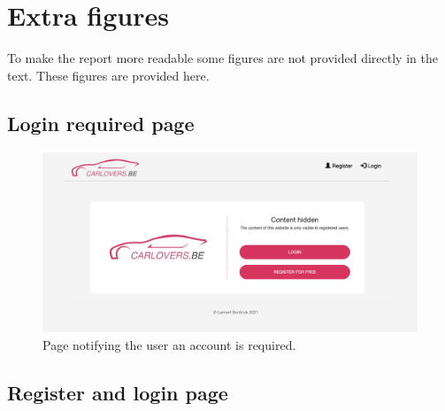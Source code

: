 \chapter*{Extra figures}
\label{ch:extra_figures}

To make the report more readable some figures are not provided directly in the text.
These figures are provided here.

\section*{Login required page}

\begin{figure}[H]
    \centering
    \includegraphics[width=\linewidth]{images/loginrequired.png}
    \captionsetup{width=0.9\linewidth}
    \captionsetup{justification=centering}
    \caption{Page notifying the user an account is required.}
    \label{fig:login-requred}
\end{figure}

\clearpage
\section*{Register and login page}

